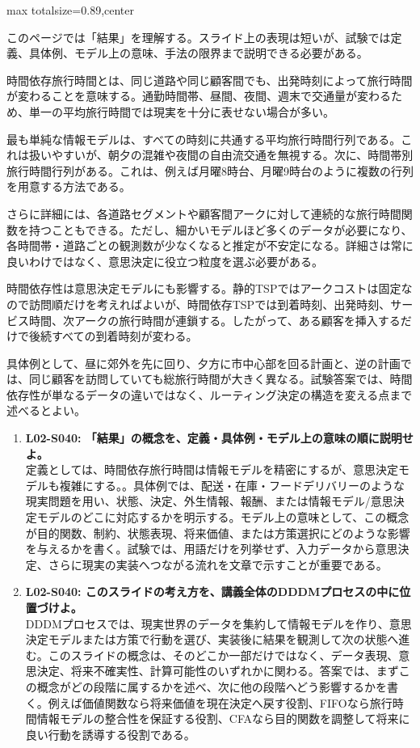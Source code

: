 \begin{minipage}[t]{0.58\textwidth}
\begin{adjustbox}{max totalsize={\textwidth}{0.89\textheight},center}
\begin{minipage}{\textwidth}\scriptsize
{}このページでは「結果」を理解する。スライド上の表現は短いが、試験では定義、具体例、モデル上の意味、手法の限界まで説明できる必要がある。\par
時間依存旅行時間とは、同じ道路や同じ顧客間でも、出発時刻によって旅行時間が変わることを意味する。通勤時間帯、昼間、夜間、週末で交通量が変わるため、単一の平均旅行時間では現実を十分に表せない場合が多い。\par
最も単純な情報モデルは、すべての時刻に共通する平均旅行時間行列である。これは扱いやすいが、朝夕の混雑や夜間の自由流交通を無視する。次に、時間帯別旅行時間行列がある。これは、例えば月曜8時台、月曜9時台のように複数の行列を用意する方法である。\par
さらに詳細には、各道路セグメントや顧客間アークに対して連続的な旅行時間関数を持つこともできる。ただし、細かいモデルほど多くのデータが必要になり、各時間帯・道路ごとの観測数が少なくなると推定が不安定になる。詳細さは常に良いわけではなく、意思決定に役立つ粒度を選ぶ必要がある。\par
時間依存性は意思決定モデルにも影響する。静的TSPではアークコストは固定なので訪問順だけを考えればよいが、時間依存TSPでは到着時刻、出発時刻、サービス時間、次アークの旅行時間が連鎖する。したがって、ある顧客を挿入するだけで後続すべての到着時刻が変わる。\par
具体例として、昼に郊外を先に回り、夕方に市中心部を回る計画と、逆の計画では、同じ顧客を訪問していても総旅行時間が大きく異なる。試験答案では、時間依存性が単なるデータの違いではなく、ルーティング決定の構造を変える点まで述べるとよい。\par{}\begin{enumerate}\item \textbf{L02-S040: 「結果」の概念を、定義・具体例・モデル上の意味の順に説明せよ。}\\定義としては、時間依存旅行時間は情報モデルを精密にするが、意思決定モデルも複雑にする。。具体例では、配送・在庫・フードデリバリーのような現実問題を用い、状態、決定、外生情報、報酬、または情報モデル/意思決定モデルのどこに対応するかを明示する。モデル上の意味として、この概念が目的関数、制約、状態表現、将来価値、または方策選択にどのような影響を与えるかを書く。試験では、用語だけを列挙せず、入力データから意思決定、さらに現実の実装へつながる流れを文章で示すことが重要である。\item \textbf{L02-S040: このスライドの考え方を、講義全体のDDDMプロセスの中に位置づけよ。}\\DDDMプロセスでは、現実世界のデータを集約して情報モデルを作り、意思決定モデルまたは方策で行動を選び、実装後に結果を観測して次の状態へ進む。このスライドの概念は、そのどこか一部だけではなく、データ表現、意思決定、将来不確実性、計算可能性のいずれかに関わる。答案では、まずこの概念がどの段階に属するかを述べ、次に他の段階へどう影響するかを書く。例えば価値関数なら将来価値を現在決定へ戻す役割、FIFOなら旅行時間情報モデルの整合性を保証する役割、CFAなら目的関数を調整して将来に良い行動を誘導する役割である。\end{enumerate}

\end{minipage}
\end{adjustbox}
\end{minipage}

